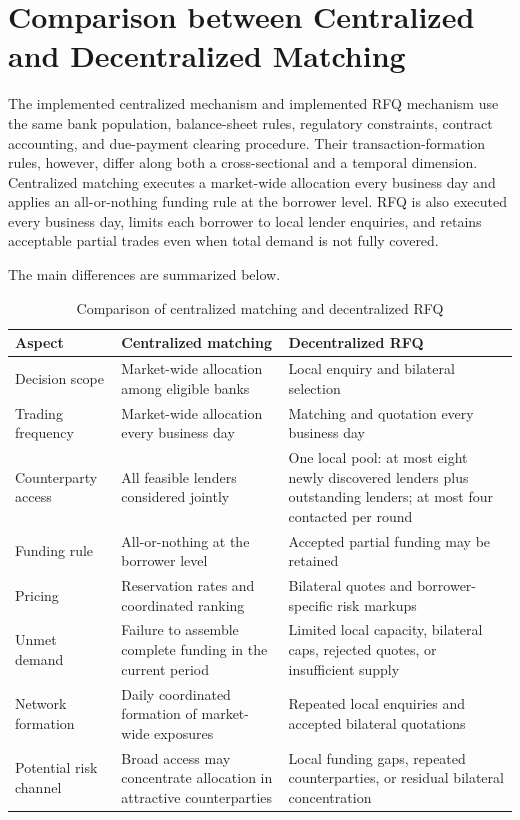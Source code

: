 \section{Comparison between Centralized and Decentralized Matching}

The implemented centralized mechanism and implemented RFQ mechanism use the same bank population,
balance-sheet rules, regulatory constraints, contract accounting, and
due-payment clearing procedure. Their transaction-formation rules,
however, differ along both a cross-sectional and a temporal dimension.
Centralized matching executes a market-wide allocation every business day
and applies an all-or-nothing funding rule at the borrower level. RFQ is
also executed every business day,
limits each borrower to local lender enquiries, and retains acceptable
partial trades even when total demand is not fully covered.

The main differences are summarized below.

\begin{table}[htbp]
\centering
\caption{Comparison of centralized matching and decentralized RFQ}
\label{tab:matching-comparison}
\small
\renewcommand{\arraystretch}{1.18}
\begin{tabularx}{\textwidth}{@{}>{\raggedright\arraybackslash}p{}XX@{}}
\toprule
\textbf{Aspect} & \textbf{Centralized matching} & \textbf{Decentralized RFQ}\\
\midrule
Decision scope & Market-wide allocation among eligible banks & Local enquiry and bilateral selection\\
Trading frequency & Market-wide allocation every business day & Matching and quotation every business day\\
Counterparty access & All feasible lenders considered jointly & One local pool: at most eight newly discovered lenders plus outstanding lenders; at most four contacted per round\\
Funding rule & All-or-nothing at the borrower level & Accepted partial funding may be retained\\
Pricing & Reservation rates and coordinated ranking & Bilateral quotes and borrower-specific risk markups\\
Unmet demand & Failure to assemble complete funding in the current period & Limited local capacity, bilateral caps, rejected quotes, or insufficient supply\\
Network formation & Daily coordinated formation of market-wide exposures & Repeated local enquiries and accepted bilateral quotations\\
Potential risk channel & Broad access may concentrate allocation in attractive counterparties & Local funding gaps, repeated counterparties, or residual bilateral concentration\\
\bottomrule
\end{tabularx}
\end{table}

